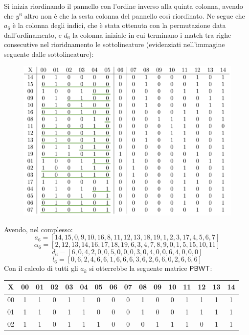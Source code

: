 \begin{esempio}
\begin{table}[H]
\begin{tabular}{c|ccccccccccccccc}
    \end{tabular}
  \end{table}
  Si inizia riordinando il pannello con l'ordine inverso alla
  quinta colonna, avendo che $y^6$ altro non è che la sesta colonna del pannello
  così riordinato. Ne segue che $a_6$ è la colonna degli indici, che è stata
  ottenuta con la permutazione data dall'ordinamento, e $d_6$ la
  colonna iniziale in cui terminano i match tra righe consecutive nel
  rioridnamento le sottolineature (evidenziati nell'immagine seguente dalle
  sottolineature):   
  \begin{figure}[H]
    \centering
    \includegraphics[scale = 0.325]{img/matrix1.pdf}
  \end{figure}
  \noindent
  Avendo, nel complesso:
  \[a_6=[14,15,0,9,10,16,8,11,12,13,18,19,1,2,3,17,4,5,6,7]\]
  \[\alpha_6=[2,12,13,14,16,17,18,19,6,3,4,7,8,9,0,1,5,15,10,11]\]
  \[d_6=[6,0,4,2,0,0,5,0,0,0,3,0,4,0,0,6,4,0,0,0]\]
  \[l_6=[0,6,2,4,6,6,1,6,6,6,3,6,2,6,6,0,2,6,6,6]\]
  Con il calcolo di tutti gli $a_k$ si otterrebbe la seguente matrice $\mbox{\rm {\sf PBWT}}$:
  \begin{table}[H]
  \centering
  \scriptsize
  \begin{tabular}{c|ccccccccccccccc}
    X & 00 & 01 & 02 & 03 & 04 & 05 & 06 & 07 & 08 & 09 & 10 & 11 & 12 & 13
    & 14 \\
    \hline
    00 & 1 & 1 & 0 & 1 & 1 & 0 & 0 & 0 & 1 & 0 & 0 & 1 & 1 & 1 & 1 \\
    01 & 1 & 1 & 0 & 1 & 1 & 0 & 0 & 0 & 1 & 0 & 0 & 1 & 1 & 1 & 1 \\
    02 & 1 & 1 & 0 & 1 & 1 & 1 & 0 & 0 & 0 & 1 & 1 & 1 & 0 & 1 & 1 \\

\end{tabular}
\end{table}
\end{esempio}
